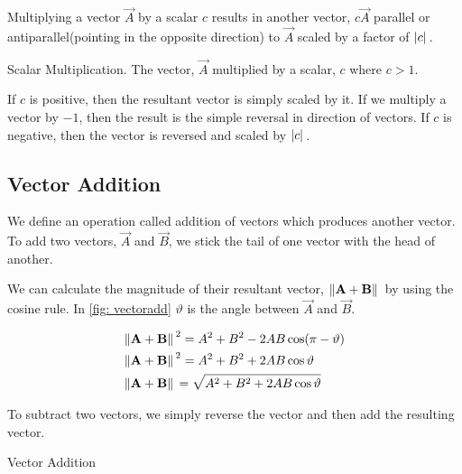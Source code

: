 Multiplying a vector \(\vec{A}\) by a scalar \(c\) results
in another vector, \(c\vec{A}\) parallel or antiparallel(pointing in the opposite 
direction) to \(\vec{A}\) scaled by a factor of \(\abs*{c}\).

\newpage

\begin{marginfigure}
    \centering
    \caption{Scalar Multiplication. The vector, \(\vec{A}\) multiplied 
    by a scalar, \(c\) where \(c > 1\).}
\end{marginfigure}


If \(c\) is positive, then the resultant vector is simply scaled by it.
If we multiply a vector by \(-1\), then the result is the simple
reversal in direction of vectors. If \(c\) is negative, then the 
vector is reversed and scaled by \(\abs*{c}\). 

\subsection{Vector Addition}

We define an operation called addition of vectors which produces another vector.
To add two vectors, \(\vec{A}\) and \(\vec{B}\), we stick the tail
of one vector with the head of another. 

We can calculate the magnitude of their resultant vector, \(\norm*{\boldsymbol{\mathbf{A}} + \boldsymbol{\mathbf{B}}}\)
by using the cosine rule. In \cref{fig: vectoradd} \(\vartheta\) is the angle between 
\(\vec{A}\) and \(\vec{B}\).

\begin{align*}
    &\norm*{\boldsymbol{\mathbf{A}} + \boldsymbol{\mathbf{B}}}^2 = A^2 + B^2 - 2AB\cos(\pi - \vartheta) \\
    &\norm*{\boldsymbol{\mathbf{A}} + \boldsymbol{\mathbf{B}}}^2 = A^2 + B^2 + 2AB\cos\vartheta \\
    &\norm*{\boldsymbol{\mathbf{A}} + \boldsymbol{\mathbf{B}}} = \sqrt{A^2 + B^2 + 2AB\cos\vartheta}
\end{align*}

To subtract two vectors, we simply reverse the vector and then add the resulting vector.

\begin{marginfigure}
    \vspace{2em}
    \caption{Vector Addition}
    \label{fig: vectoradd}
\end{marginfigure}

